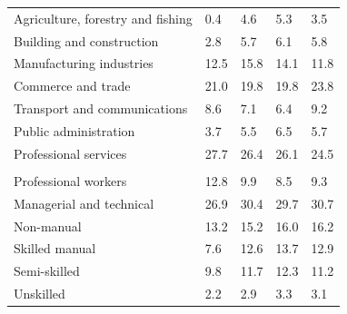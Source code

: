 \documentclass{article}
\begin{document}
\begin{table}[h]
\begin{tabular}{KTTTT}
    \hline
Agriculture, forestry and fishing  & 0.4& 4.6& 5.3& 3.5\\
Building and construction & 2.8& 5.7& 6.1& 5.8\\
Manufacturing industries & 12.5& 15.8& 14.1& 11.8\\
Commerce and trade  & 21.0& 19.8& 19.8& 23.8\\
Transport and communications  & 8.6& 7.1& 6.4& 9.2\\
Public administration & 3.7& 5.5& 6.5& 5.7\\
Professional services & 27.7& 26.4& 26.1& 24.5\\
\hline
    \\ 
    \hline
Professional workers  & 12.8&  9.9 &  8.5&  9.3\\
Managerial and technical & 26.9& 30.4& 29.7& 30.7\\
Non-manual & 13.2& 15.2& 16.0& 16.2\\
Skilled manual &  7.6& 12.6& 13.7& 12.9\\
Semi-skilled &  9.8& 11.7& 12.3& 11.2\\
Unskilled  & 2.2& 2.9& 3.3& 3.1\\
\end{tabular}
\end{table}
\pagebreak
\end{document}
